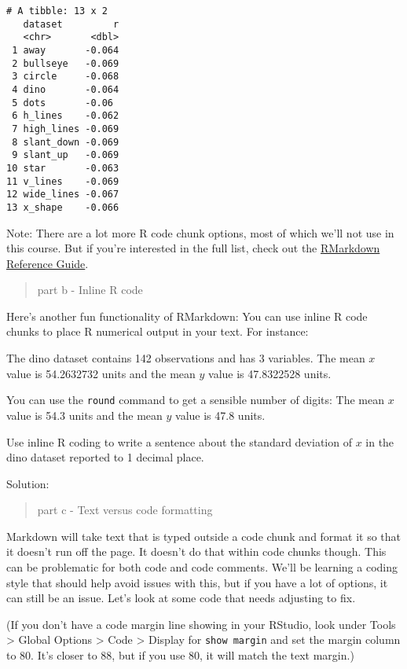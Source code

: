 \documentclass[
  letterpaper,
  DIV=11,
  numbers=noendperiod]{scrartcl}
\begin{document}
\begin{verbatim}
# A tibble: 13 x 2
   dataset         r
   <chr>       <dbl>
 1 away       -0.064
 2 bullseye   -0.069
 3 circle     -0.068
 4 dino       -0.064
 5 dots       -0.06 
 6 h_lines    -0.062
 7 high_lines -0.069
 8 slant_down -0.069
 9 slant_up   -0.069
10 star       -0.063
11 v_lines    -0.069
12 wide_lines -0.067
13 x_shape    -0.066
\end{verbatim}

Note: There are a lot more R code chunk options, most of which we'll not
use in this course. But if you're interested in the full list, check out
the
\href{https://www.rstudio.com/wp-content/uploads/2015/03/rmarkdown-reference.pdf}{RMarkdown
Reference Guide}.

\begin{quote}
part b - Inline R code
\end{quote}

Here's another fun functionality of RMarkdown: You can use inline R code
chunks to place R numerical output in your text. For instance:

The dino dataset contains 142 observations and has 3 variables. The mean
\(x\) value is 54.2632732 units and the mean \(y\) value is 47.8322528
units.

You can use the \texttt{round} command to get a sensible number of
digits: The mean \(x\) value is 54.3 units and the mean \(y\) value is
47.8 units.

Use inline R coding to write a sentence about the standard deviation of
\(x\) in the dino dataset reported to 1 decimal place.

Solution:

\begin{quote}
part c - Text versus code formatting
\end{quote}

Markdown will take text that is typed outside a code chunk and format it
so that it doesn't run off the page. It doesn't do that within code
chunks though. This can be problematic for both code and code comments.
We'll be learning a coding style that should help avoid issues with
this, but if you have a lot of options, it can still be an issue. Let's
look at some code that needs adjusting to fix.

(If you don't have a code margin line showing in your RStudio, look
under Tools \textgreater{} Global Options \textgreater{} Code
\textgreater{} Display for \texttt{show\ margin} and set the margin
column to 80. It's closer to 88, but if you use 80, it will match the
text margin.)
\end{document}

